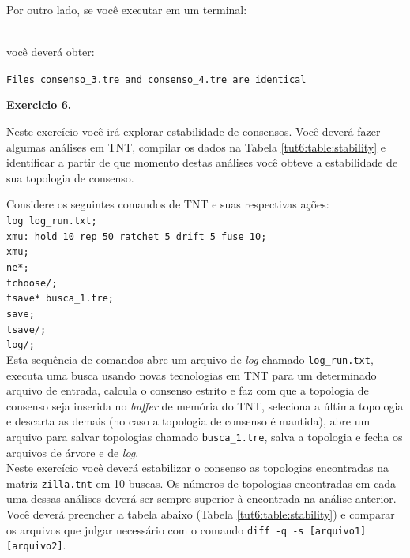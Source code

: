 \begin{refsection}
Por outro lado, se você executar em um terminal:

\\

você deverá obter:

\texttt{Files consenso\_3.tre and consenso\_4.tre are identical}\\

\begin{blackBlock}{\textbf{Exercicio 6.}}\label{tut6:ex:6.4}

Neste exercício você irá explorar estabilidade de consensos. Você deverá fazer algumas análises em TNT, compilar os dados na Tabela \ref{tut6:table:stability} e identificar a partir de que momento destas análises você obteve a estabilidade de sua topologia de consenso.

\end{blackBlock}

	Considere os seguintes comandos de TNT e suas respectivas ações:\\
\texttt{log log\_run.txt;}\\
\texttt{xmu: hold 10 rep 50 ratchet 5 drift 5 fuse 10;}\\
\texttt{xmu;}\\
\texttt{ne*;}\\
\texttt{tchoose/;}\\
\texttt{tsave* busca\_1.tre;}\\
\texttt{save;}\\
\texttt{tsave/;}\\
\texttt{log/;}\\

Esta sequência de comandos abre um arquivo de \textit{log} chamado \texttt{log\_run.txt}, executa uma busca usando novas tecnologias em TNT para um determinado arquivo de entrada, calcula o consenso estrito e faz com que a topologia de consenso seja inserida no \textit{buffer} de memória do TNT, seleciona a última topologia e descarta as demais (no caso a topologia de consenso é mantida), abre um arquivo para salvar topologias chamado \texttt{busca\_1.tre}, salva a topologia e fecha os arquivos de árvore e de \textit{log}.\\

Neste exercício você deverá estabilizar o consenso as topologias encontradas na matriz \texttt{zilla.tnt} em 10 buscas. Os números de topologias encontradas em cada uma dessas análises deverá ser sempre superior à encontrada na análise anterior. Você deverá preencher a tabela abaixo (Tabela \ref{tut6:table:stability}) e comparar os arquivos que julgar necessário com o comando \texttt{diff -q -s [arquivo1] [arquivo2]}.
	

\end{refsection}
